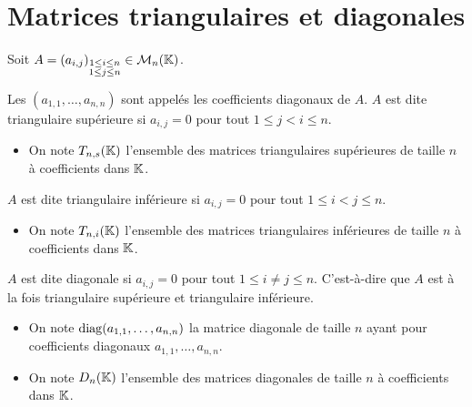 \documentclass[12pt, a4paper]{report}
\begin{document}
\section{Matrices triangulaires et diagonales}

\begin{definition}
    Soit $A = (a_{i,j})_{\substack{1 \leq i \leq n\\ 1\leq j \leq n}} \in \mathcal M_{n}(\mathbb{K})$.

    \begin{outline}[enumerate]
        \1 Les $(a_{1,1},\dots,a_{n,n})$ sont appelés les coefficients diagonaux de $A$.
        \1 $A$ est dite triangulaire supérieure si $a_{i,j} = 0$ pour tout $1 \leq j < i \leq n$.
        \begin{itemize}
            \item On note $T_{n,s}(\mathbb{K})$ l'ensemble des matrices triangulaires supérieures de taille $n$ à coefficients dans $\mathbb{K}$.
        \end{itemize}
        \1 $A$ est dite triangulaire inférieure si $a_{i,j} = 0$ pour tout $1 \leq i < j \leq n$.
        \begin{itemize}
            \item On note $T_{n,i}(\mathbb{K})$ l'ensemble des matrices triangulaires inférieures de taille $n$ à coefficients dans $\mathbb{K}$.
        \end{itemize}
        \1 $A$ est dite diagonale si $a_{i,j} = 0$ pour tout $1 \leq i \neq j \leq n$. C'est-à-dire que $A$ est à la fois triangulaire supérieure et triangulaire inférieure.
        \begin{itemize}
            \item On note $\mathrm{diag}(a_{1,1},\dots,a_{n,n})$ la matrice diagonale de taille $n$ ayant pour coefficients diagonaux $a_{1,1},\dots,a_{n,n}$.
            \item On note $D_n(\mathbb{K})$ l'ensemble des matrices diagonales de taille $n$ à coefficients dans $\mathbb{K}$.
        \end{itemize}
    \end{outline}
\end{definition}
\end{document}
